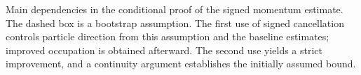 \caption{Main dependencies in the conditional proof of the signed momentum estimate.
The dashed box is a bootstrap assumption. The first use of signed
cancellation controls particle direction from this assumption and
the baseline estimates; improved occupation is obtained afterward.
The second use yields a strict improvement, and a continuity argument
establishes the initially assumed bound.}
\label{fig:dependencies}
